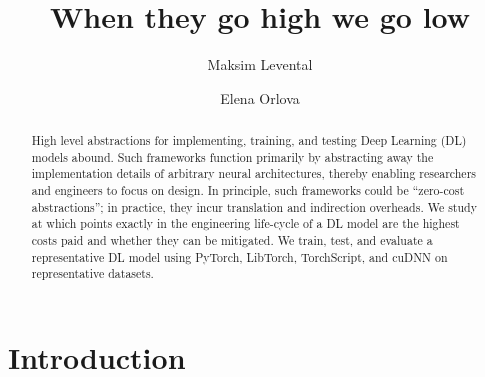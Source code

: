 \documentclass[sigconf]{acmart}
\begin{document}
\title{When they go high we go low}

\author{Maksim Levental}
\author{Elena Orlova}

\renewcommand{\shortauthors}{Levental and Orlova}

\begin{abstract}
  High level abstractions for implementing, training, and testing Deep Learning (DL) models abound.
  Such frameworks function primarily by abstracting away the implementation details of arbitrary neural architectures, thereby enabling researchers and engineers to focus on design.
  In principle, such frameworks could be ``zero-cost abstractions'';
  in practice, they incur translation and indirection overheads.
  We study at which points exactly in the engineering life-cycle of a DL model are the highest costs paid and whether they can be mitigated.
  We train, test, and evaluate a representative DL model using PyTorch, LibTorch, TorchScript, and cuDNN on representative datasets.
\end{abstract}

%

\maketitle

\section{Introduction}\label{sec:introduction}
\end{document}
